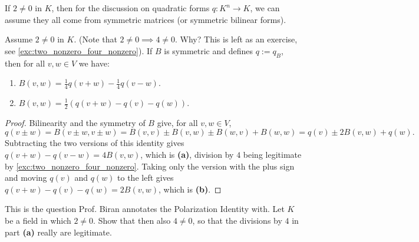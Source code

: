 \begin{conclusion}
If $2 \neq 0$ in $K$, then for the discussion on quadratic forms $q \colon K^n \to K$, we can assume they all come from symmetric matrices (or symmetric bilinear forms).
\end{conclusion}

\begin{theorem*}
\label{thm:polarization_identity_bilinear}
Assume $2 \neq 0$ in $K$. (Note that $2 \neq 0 \implies 4 \neq 0$. Why? This is left as an exercise, see \cref{exc:two_nonzero_four_nonzero}).
If $B$ is symmetric and defines $q := q_B$, then for all $v, w \in V$ we have:
\begin{enumerate}[label=\textbf{(\alph*)}]
    \item $B(v, w) = \frac{1}{4}q(v + w) - \frac{1}{4}q(v - w)$.
    \item $B(v, w) = \frac{1}{2}(q(v + w) - q(v) - q(w))$.
\end{enumerate}
\end{theorem*}

\begin{proof}
Bilinearity and the symmetry of $B$ give, for all $v, w \in V$,
\[
    q(v \pm w) = B(v \pm w, v \pm w) = B(v, v) \pm B(v, w) \pm B(w, v) + B(w, w) = q(v) \pm 2 B(v, w) + q(w).
\]
Subtracting the two versions of this identity gives $q(v+w) - q(v-w) = 4 B(v, w)$, which is \textbf{(a)}, division by $4$ being legitimate by \cref{exc:two_nonzero_four_nonzero}. Taking only the version with the plus sign and moving $q(v)$ and $q(w)$ to the left gives $q(v+w) - q(v) - q(w) = 2 B(v, w)$, which is \textbf{(b)}.
\end{proof}

\begin{exercise}
\label{exc:two_nonzero_four_nonzero}
This is the question Prof. Biran annotates the Polarization Identity with. Let $K$ be a field in which $2 \neq 0$. Show that then also $4 \neq 0$, so that the divisions by $4$ in part \textbf{(a)} really are legitimate.
\end{exercise}

